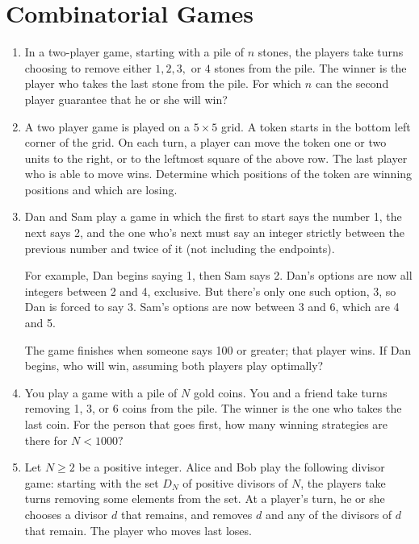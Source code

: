 \documentclass[11pt]{scrartcl}
\begin{document}
\section{Combinatorial Games}
\begin{enumerate}[resume]
    \item In a two-player game, starting with a pile of $ n $ stones, the players take turns choosing to remove either $ 1,2,3, $ or $ 4 $ stones from the pile. The winner is the player who takes the last stone from the pile. For which $ n $ can the second player guarantee that he or she will win?

    \item A two player game is played on a $5 \times 5$ grid. A token starts in the bottom left corner of the grid. On each turn, a player can move the token one or two units to the right, or to the leftmost square of the above row. The last player who is able to move wins. Determine which positions of the token are winning positions and which are losing.

    \item Dan and Sam play a game in which the first to start says the number 1, the next says 2, and the one who's next must say an integer strictly between the previous number and twice of it (not including the endpoints).
    
    For example, Dan begins saying 1, then Sam says 2. Dan's options are now all integers between 2 and 4, exclusive. But there's only one such option, 3, so Dan is forced to say 3. Sam's options are now between 3 and 6, which are 4 and 5.
    
    The game finishes when someone says 100 or greater; that player wins. If Dan begins, who will win, assuming both players play optimally?


    \item You play a game with a pile of $N$ gold coins. You and a friend take turns removing 1, 3, or 6 coins from the pile. The winner is the one who takes the last coin. For the person that goes first, how many winning strategies are there for $N < 1000?$

    \item Let $ N \ge 2 $ be a positive integer. Alice and Bob play the following divisor game: starting with the set $ D_N $ of positive divisors of $ N$, the players take turns removing some elements from the set. At a player's turn, he or she chooses a divisor $ d $ that remains, and removes $ d $ and any of the divisors of $ d $ that remain. The player who moves last loses.
    

\end{enumerate}
\end{document}
